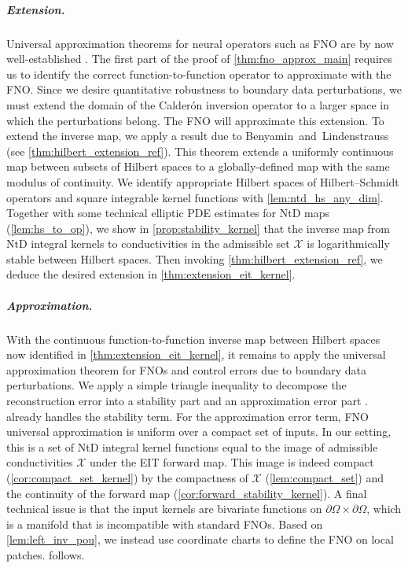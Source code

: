 \documentclass[pdflatex,sn-mathphys-num]{sn-jnl-preprint}
\newcommand{\cX}{\mathcal{X}}
\newcommand{\pOmega}{{\partial\Omega}}
\theoremstyle{thmstyleone}%
\theoremstyle{thmstyletwo}%
\theoremstyle{thmstylethree}%
\numberwithin{equation}{section}
\numberwithin{theorem}{section}
\begin{document}
\subparagraph*{\emph{\textbf{Extension.}}}
Universal approximation theorems for neural operators such as FNO are by now well-established \cite{kovachki2021neural,kovachki2021universal,lanthaler2023nonlocality}. The first part of the proof of \cref{thm:fno_approx_main} requires us to identify the correct function-to-function operator to approximate with the FNO. Since we desire quantitative robustness to boundary data perturbations, we must extend the domain of the Calder\'on inversion operator to a larger space in which the perturbations belong. The FNO will approximate this extension. To extend the inverse map, we apply a result due to Benyamin~and~Lindenstrauss~\cite[Thm.~1.12, p.~18]{benyamini1998geometric} (see \cref{thm:hilbert_extension_ref}). This theorem extends a uniformly continuous map between subsets of Hilbert spaces to a globally-defined map with the same modulus of continuity. We identify appropriate Hilbert spaces of Hilbert--Schmidt operators and square integrable kernel functions with \cref{lem:ntd_hs_any_dim}. Together with some technical elliptic PDE estimates for NtD maps (\cref{lem:hs_to_op}), we show in \cref{prop:stability_kernel} that the inverse map from NtD integral kernels to conductivities in the admissible set $\cX$ is logarithmically stable between Hilbert spaces. Then invoking \cref{thm:hilbert_extension_ref}, we deduce the desired extension in \cref{thm:extension_eit_kernel}.
	
\subparagraph*{\emph{\textbf{Approximation.}}}
With the continuous function-to-function inverse map between Hilbert spaces now identified in \cref{thm:extension_eit_kernel}, it remains to apply the universal approximation theorem for FNOs and control errors due to boundary data perturbations. We apply a simple triangle inequality to decompose the reconstruction error into a stability part and an approximation error part \cite[Sec. 4.1.2, Eqn. (4.10), p. 27]{nelsen2025operator}.  already handles the stability term. For the approximation error term, FNO universal approximation is uniform over a compact set of inputs. In our setting, this is a set of NtD integral kernel functions equal to the image of admissible conductivities $\cX$ under the EIT forward map. This image is indeed compact (\cref{cor:compact_set_kernel}) by the compactness of $\cX$ (\cref{lem:compact_set}) and the continuity of the forward map (\cref{cor:forward_stability_kernel}). A final technical issue is that the input kernels are bivariate functions on $\pOmega\times\pOmega$, which is a manifold that is incompatible with standard FNOs. Based on \cref{lem:left_inv_pou}, we instead use coordinate charts to define the FNO on local patches.  follows.
\end{document}
